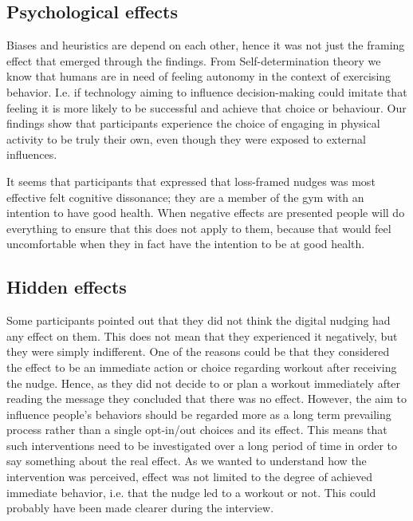 


\subsection{Psychological effects}
Biases and heuristics are depend on each other, hence it was not just the framing effect that emerged through the findings. From Self-determination theory we know that humans are in need of feeling autonomy in the context of exercising behavior. I.e. if technology aiming to influence decision-making could imitate that feeling it is more likely to be successful and achieve that choice or behaviour. Our findings show that participants experience the choice of engaging in physical activity to be truly their own, even though they were exposed to external influences. 

It seems that participants that expressed that loss-framed nudges was most effective felt cognitive dissonance; they are a member of the gym with an intention to have good health. When negative effects are presented people will do everything to ensure that this does not apply to them, because that would feel uncomfortable when they in fact have the intention to be at good health. 

\subsection{Hidden effects}
Some participants pointed out that they did not think the digital nudging had any effect on them. This does not mean that they experienced it negatively, but they were simply indifferent. One of the reasons could be that they considered the effect to be an immediate action or choice regarding workout after receiving the nudge. Hence, as they did not decide to or plan a workout immediately after reading the message they concluded that there was no effect. However, the aim to influence people's behaviors should be regarded more as a long term prevailing process rather than a single opt-in/out choices and its effect. This means that such interventions need to be investigated over a long period of time in order to say something about the real effect. As we wanted to understand how the intervention was perceived, effect was not limited to the degree of achieved immediate behavior, i.e. that the nudge led to a workout or not. This could probably have been made clearer during the interview.

